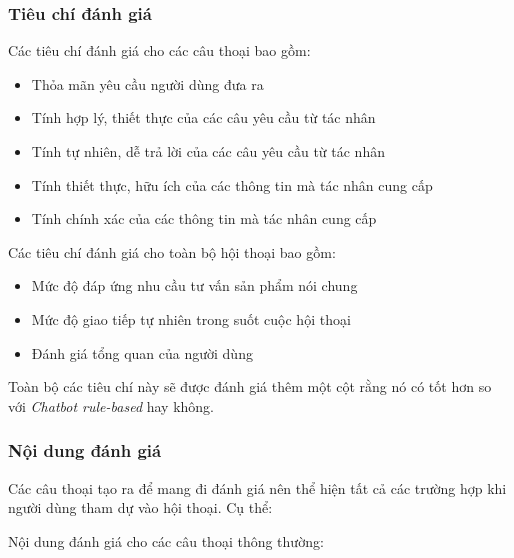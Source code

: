 \subsubsection{Tiêu chí đánh giá}
Các tiêu chí đánh giá cho các câu thoại bao gồm:

\begin{itemize}
    \item Thỏa mãn yêu cầu người dùng đưa ra
    \item Tính hợp lý, thiết thực của các câu yêu cầu từ tác nhân
    \item Tính tự nhiên, dễ trả lời của các câu yêu cầu từ tác nhân
    \item Tính thiết thực, hữu ích của các thông tin mà tác nhân cung cấp
    \item Tính chính xác của các thông tin mà tác nhân cung cấp
\end{itemize}

Các tiêu chí đánh giá cho toàn bộ hội thoại bao gồm:

\begin{itemize}
    \item Mức độ đáp ứng nhu cầu tư vấn sản phẩm nói chung
    \item Mức độ giao tiếp tự nhiên trong suốt cuộc hội thoại
    \item Đánh giá tổng quan của người dùng
\end{itemize}

Toàn bộ các tiêu chí này sẽ được đánh giá thêm một cột rằng nó có
tốt hơn so với \textit{Chatbot rule-based} hay không.

\subsubsection{Nội dung đánh giá}
Các câu thoại tạo ra để mang đi đánh giá nên thể hiện tất cả các
trường hợp khi người dùng tham dự vào hội thoại. Cụ thể:

Nội dung đánh giá cho các câu thoại thông thường:

